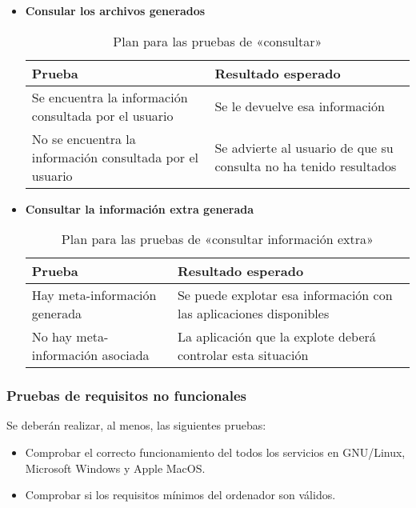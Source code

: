 \begin{itemize}
  \item \textbf{Consular los archivos generados}
	\begin{table}[H]
	 \begin{center}
	  \begin{tabular}{|p{5cm}|p{7cm}|}
		\hline
		\textbf{Prueba} & \textbf{Resultado esperado} \\ 
		\hline
		Se encuentra la información consultada por el usuario
		& 
		Se le devuelve esa información
		\\\hline
		No se encuentra la información consultada por el usuario
		& 
		Se advierte al usuario de que su consulta no ha tenido resultados
		\\\hline
	  \end{tabular}
	  \caption{Plan para las pruebas de «consultar»}
	 \end{center}
	\end{table}

  \item \textbf{Consultar la información extra generada}
	\begin{table}[H]
	 \begin{center}
	  \begin{tabular}{|p{5cm}|p{7cm}|}
		\hline
		\textbf{Prueba} & \textbf{Resultado esperado} \\ 
		\hline
		Hay meta-información generada
		& 
		Se puede explotar esa información con las aplicaciones disponibles
		\\\hline
		No hay meta-información asociada
		& 
		La aplicación que la explote deberá controlar esta situación
		\\\hline
	  \end{tabular}
	  \caption{Plan para las pruebas de «consultar información extra»}
	 \end{center}
	\end{table}

\end{itemize}


\subsubsection{Pruebas de requisitos no funcionales}

Se deberán realizar, al menos, las siguientes pruebas:

\begin{itemize}
  \item Comprobar el correcto funcionamiento del todos los servicios en GNU/Linux,
	Microsoft Windows y Apple MacOS.
  \item Comprobar si los requisitos mínimos del ordenador son válidos.
\end{itemize}
